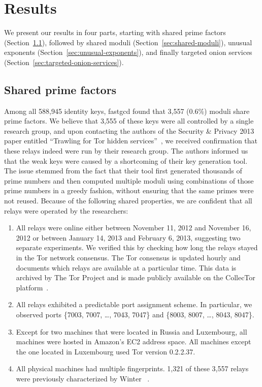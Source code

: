 \section{Results}
\label{sec:results}
We present our results in four parts, starting with shared prime factors
(Section~\ref{sec:shared-primes}), followed by shared moduli
(Section~\ref{sec:shared-moduli}), unusual exponents 
(Section~\ref{sec:unusual-exponents}), and finally targeted onion services
(Section~\ref{sec:targeted-onion-services}).

\subsection{Shared prime factors}
\label{sec:shared-primes}
Among all 588,945 identity keys, fastgcd found that 3,557 (0.6\%)
moduli share prime factors.  We believe that 3,555 of these keys were all
controlled by a single research group, and upon contacting the authors of the
Security \& Privacy 2013 paper entitled ``Trawling for Tor hidden
services''~\cite{Biryukov2013a}, we received confirmation that these relays
indeed were run by their research group.  The authors informed us that the weak
keys were caused by a shortcoming of their key generation tool. The issue
stemmed from the fact that their tool first generated thousands of prime numbers
and then computed multiple moduli using combinations of those prime numbers in a
greedy fashion, without ensuring that the same primes were not reused.  Because
of the following shared properties, we are confident that all relays were
operated by the researchers:

\begin{enumerate}
	\item All relays were online either between November 11, 2012 and
		November 16, 2012 or between January 14, 2013 and February 6, 2013,
		suggesting two separate experiments. We verified this by checking how
		long the relays stayed in the Tor network consensus. The Tor consensus
		is updated hourly and documents which relays are available at a
		particular time. This data is archived by The Tor Project and is made
		publicly available on the CollecTor platform~\cite{collector}.

	\item All relays exhibited a predictable port assignment scheme.  In
		particular, we observed ports \{7003, 7007, \dots, 7043, 7047\} and
		\{8003, 8007, \dots, 8043, 8047\}.

	\item Except for two machines that were located in Russia and Luxembourg,
		all machines were hosted in Amazon's EC2 address space.  All machines
		except the one located in Luxembourg used Tor version 0.2.2.37.

	\item All physical machines had multiple fingerprints.  1,321 of these 3,557
		relays were previously characterized by Winter
		\ea~\cite[\S~5.1]{Winter2016a}.
\end{enumerate}

